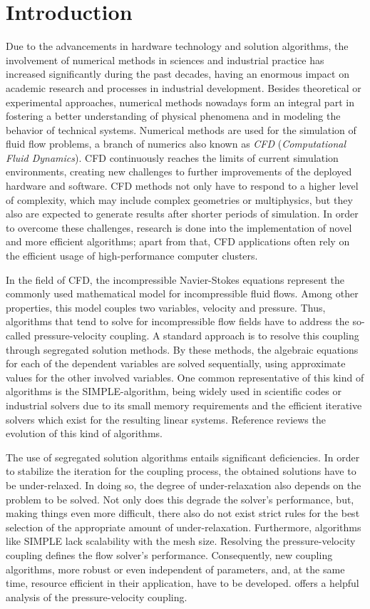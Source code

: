 \chapter{Introduction}

Due to the advancements in hardware technology and solution algorithms, the involvement of numerical methods in sciences and industrial practice has increased significantly during the past decades, having an enormous impact on academic research and processes in industrial development. Besides theoretical or experimental approaches, numerical methods nowadays form an integral part in fostering a better understanding of physical phenomena and in modeling the behavior of technical systems. Numerical methods are used for the simulation of fluid flow problems, a branch of numerics also known as \emph{CFD} (\emph{Computational Fluid Dynamics}). CFD continuously reaches the limits of current simulation environments, creating new challenges to further improvements of the deployed hardware and software. CFD methods not only have to respond to a higher level of complexity, which may include complex geometries or multiphysics, but they also are expected to generate results after shorter periods of simulation. In order to overcome these challenges, research is done into the implementation of novel and more efficient algorithms; apart from that, CFD applications often rely on the efficient usage of high-performance computer clusters. 

In the field of CFD, the incompressible Navier-Stokes equations represent the commonly used mathematical model for incompressible fluid flows. Among other properties, this model couples two variables, velocity and pressure. Thus, algorithms that tend to solve for incompressible flow fields have to address the so-called pressure-velocity coupling. A standard approach is to resolve this coupling through segregated solution methods. By these methods, the algebraic equations for each of the dependent variables are solved sequentially, using approximate values for the other involved variables. One common representative of this kind of algorithms is the SIMPLE-algorithm, being widely used in scientific codes or industrial solvers due to its small memory requirements and the efficient iterative solvers which exist for the resulting linear systems. Reference \cite{acharya07} reviews the evolution of this kind of algorithms.

The use of segregated solution algorithms entails significant deficiencies. In order to stabilize the iteration for the coupling process, the obtained solutions have to be under-relaxed. In doing so, the degree of under-relaxation also depends on the problem to be solved. Not only does this degrade the solver's performance, but, making things even more difficult, there also do not exist strict rules for the best selection of the appropriate amount of under-relaxation. Furthermore, algorithms like SIMPLE lack scalability with the mesh size. Resolving the pressure-velocity coupling defines the flow solver's performance. Consequently, new coupling algorithms, more robust or even independent of parameters, and, at the same time, resource efficient in their application, have to be developed. \cite{peric90} offers a helpful analysis of the pressure-velocity coupling.

